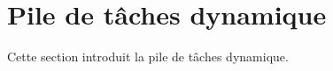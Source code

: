 \section{Pile de t\^aches dynamique}
\label{chap:basics:sec:sotDyn}

Cette section introduit la pile de t\^aches dynamique.
